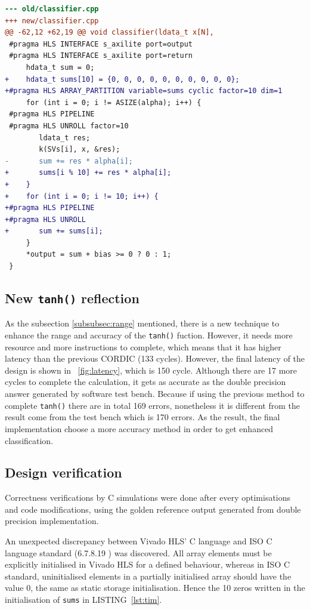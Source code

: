 \documentclass[journal]{IEEEtran}
\newcommand{\fref}[1]{\figurename~\ref{#1}}
\newcommand{\lref}[1]{LISTING~\ref{#1}}
\begin{document}
\begin{lstlisting}[language=diff,caption={Code modification to resolve timing issue},captionpos=b,label=lst:tim]
--- old/classifier.cpp
+++ new/classifier.cpp
@@ -62,12 +62,19 @@ void classifier(ldata_t x[N],
 #pragma HLS INTERFACE s_axilite port=output
 #pragma HLS INTERFACE s_axilite port=return
     hdata_t sum = 0;
+    hdata_t sums[10] = {0, 0, 0, 0, 0, 0, 0, 0, 0, 0};
+#pragma HLS ARRAY_PARTITION variable=sums cyclic factor=10 dim=1
     for (int i = 0; i != ASIZE(alpha); i++) {
 #pragma HLS PIPELINE
 #pragma HLS UNROLL factor=10
        ldata_t res;
        k(SVs[i], x, &res);
-       sum += res * alpha[i];
+       sums[i % 10] += res * alpha[i];
+    }
+    for (int i = 0; i != 10; i++) {
+#pragma HLS PIPELINE
+#pragma HLS UNROLL
+       sum += sums[i];
     }
     *output = sum + bias >= 0 ? 0 : 1;
 }
\end{lstlisting}

\subsection{New \texttt{tanh()} reflection}
As the subsection \ref{subsubsec:range} mentioned, there is a new technique to enhance the range and accuracy of the \texttt{tanh()} fuction. However, it needs more resource and more instructions to complete, which means that it has higher latency than the previous CORDIC (133 cycles). However, the final latency of the design is shown in \fref{fig:latency}, which is 150 cycle. Although there are 17 more cycles to complete the calculation, it gets as accurate as the double precision answer generated by software test bench. Because if using the previous method to complete \texttt{tanh()} there are in total 169 errors, nonetheless it is different from the result come from the test bench which is 170 errors. As the result, the final implementation choose a more accuracy method in order to get enhanced classification.

\subsection{Design verification}

Correctness verifications by C simulations were done after every optimisations and code modifications, using the golden reference output generated from double precision implementation.

An unexpected discrepancy between Vivado HLS' C language and ISO C language standard (6.7.8.19 \cite{iso1999iec}) was discovered. All array elements must be explicitly initialised in Vivado HLS for a defined behaviour, whereas in ISO C standard, uninitialised elements in a partially initialised array should have the value 0, the same as static storage initialisation. Hence the 10 zeros written in the initialisation of \texttt{sums} in \lref{lst:tim}.
\end{document}
